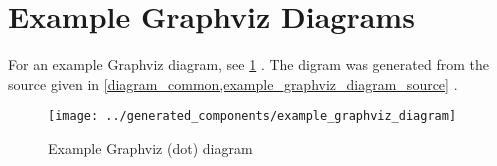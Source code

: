 \section{Example Graphviz Diagrams}

For an example Graphviz diagram, see
\cref{example_graphviz_diagram}%
.
The digram was generated from the source given in
\cref{diagram_common,example_graphviz_diagram_source}%
.

\begin{figure}[h]
    \centering
    \texttt{[image: ../generated\_components/example\_graphviz\_diagram]}
    \caption{Example Graphviz (dot) diagram}
    \label{example_graphviz_diagram}
\end{figure}



